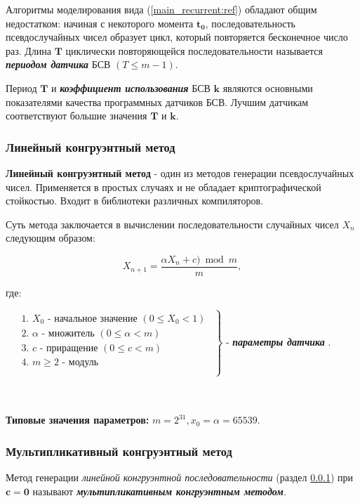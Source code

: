 Алгоритмы моделирования вида (\ref{main_recurrent:ref}) обладают общим недостатком: начиная с некоторого момента $\mathbf{t_{0}}$, последовательность псевдослучайных чисел образует цикл, который повторяется бесконечное число раз. Длина $\mathbf{T}$ циклически повторяющейся последовательности называется \textbf{\textit{периодом датчика}} БСВ $(T \leq m - 1)$.

Период $\mathbf{T}$ и \textbf{\textit{коэффициент использования}} БСВ $\mathbf{k}$ являются основными показателями качества программных датчиков БСВ. Лучшим датчикам соответствуют большие значения $\mathbf{T}$ и $\mathbf{k}$.

\subsubsection {Линейный конгруэнтный метод}\label{linear_congruential_generator}
\textbf{Линейный конгруэнтный метод} - один из методов генерации псевдослучайных чисел. Применяется в простых случаях и не обладает криптографической стойкостью. Входит в библиотеки различных компиляторов.

Суть метода заключается в вычислении последовательности случайных чисел $X_n$ следующим образом:

\begin{equation}
	X_{n+1} = \frac{\alpha X_{n} + c) \bmod m}{m},
	\label{linear_congruential_generator_formula:ref}
\end{equation}

где:

\hfill\parbox{17.5cm}{
	$
		\left.
		\begin{array}{ccc}
			\begin{aligned}
				 & \text{1. } X_{0} \text{ - начальное значение } (0 \leqslant X_{0} < 1) \\
				 & \text{2. } \alpha \text{ - множитель } (0 \leqslant \alpha < m)        \\
				 & \text{3. } c \text{ - приращение } (0 \leqslant c < m )                \\
				 & \text{4. } m \geq 2 \text{ - модуль }                                  \\
			\end{aligned}
		\end{array}
		\right\}
	$ - \textbf{\textit{параметры датчика
	}}.
}\\\\

\textbf{Типовые значения параметров:} $m = 2^{31}, x_0 = \alpha = 65539$.

\subsubsection{Мультипликативный конгруэнтный метод}
Метод генерации \textit{линейной конгруэнтной последовательности} (раздел \ref{linear_congruential_generator}) при $\mathbf{c = 0}$ называют \textbf{\textit{мультипликативным конгруэнтным методом}}.

